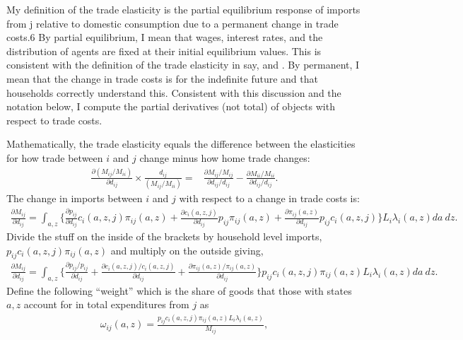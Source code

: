 \documentclass[12pt,pdftex]{article}
\begin{document}
\begin{onehalfspacing}
My definition of the trade elasticity is the partial equilibrium response of imports from j relative
to domestic consumption due to a permanent change in trade costs.6 By partial equilibrium, I
mean that wages, interest rates, and the distribution of agents are fixed at their initial equilibrium
values. This is consistent with the definition of the trade elasticity in say, \citet{arkolakis2012new} and \citet{simonovska2014elasticity}. By permanent, I mean that the change in trade costs
is for the indefinite future and that households correctly understand this. Consistent with this discussion and the notation below, I compute the partial derivatives (not total) of objects with respect to trade costs.

Mathematically, the trade elasticity equals the difference between the elasticities for how trade between $i$ and $j$ change minus how home trade changes:
\begin{align}
\frac{\partial ( M_{ij} / M_{ii} )}{\partial d_{ij}} \times \frac{d_{ij}}{( M_{ij} / M_{ii} )} =& \frac{\partial M_{ij} / M_{ij}}{\partial d_{ij} / d_{ij}}  - \frac{\partial M_{ii} / M_{ii}}{\partial d_{ij} / d_{ij}}.
\label{apx-eq:def_trade_elasticity}
\end{align}
The change in imports between $i$ and $j$ with respect to a change in trade costs is:
\begin{align}
\frac{\partial  M_{ij}}{\partial d_{ij}} = \int_{a,z} \bigg \{\frac{\partial p_{ij}}{\partial d_{ij}} c_{i}(a,z,j) \pi_{ij}(a,z) +  \frac{\partial c_{i}(a,z,j)}{\partial d_{ij}} p_{ij} \pi_{ij}(a,z) +
 \frac{\partial \pi_{ij}(a,z)}{\partial d_{ij}} p_{ij}c_{i}(a,z,j) \bigg \} L_i \lambda_{i}(a,z) da \ dz.
\end{align}
Divide the stuff on the inside of the brackets by household level imports, $p_{ij}c_{i}(a,z,j)\pi_{ij}(a,z)$ and multiply on the outside giving,
\begin{align}
\frac{\partial  M_{ij}}{\partial d_{ij}} = \int_{a,z}  \bigg \{ \frac{\partial p_{ij}/p_{ij}}{\partial d_{ij}}  + \frac{\partial c_{i}(a,z,j)/ c_{i}(a,z,j)}{\partial d_{ij}} +
 \frac{\partial \pi_{ij}(a,z) / \pi_{ij}(a,z)}{\partial d_{ij}}  \bigg \} p_{ij}c_{i}(a,z,j)\pi_{ij}(a,z) L_i \lambda_{i}(a,z)da \ dz.
\end{align}
Define the following ``weight'' which is the share of goods that those with states $a,z$ account for in total expenditures from $j$ as
\begin{align}
\omega_{ij}(a,z) = \frac{p_{ij}c_{i}(a,z,j)\pi_{ij}(a,z) L_i \lambda_{i}(a,z)}{M_{ij}},

\end{align}
\end{onehalfspacing}
\end{document}
